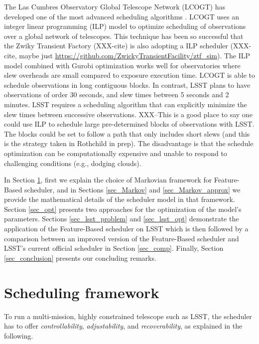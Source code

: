 \documentclass[12pt,aas_macros]{article}
\theoremstyle{definition}
\begin{document}
The Las Cumbres Observatory Global Telescope Network (LCOGT) has developed one of the most advanced scheduling algorithms \cite{Boroson14, Saunders14}. LCOGT uses an integer linear programming (ILP) model to optimize scheduling of observations over a global network of telescopes\cite{Lampoudi15}. This technique has been so successful that the Zwiky Transient Factory (XXX-cite) is also adopting a ILP scheduler (XXX-cite, maybe just \url{https://github.com/ZwickyTransientFacility/ztf_sim}). The ILP model combined with Gurobi optimization works well for observatories where slew overheads are small compared to exposure execution time. LCOGT is able to schedule observations in long contiguous blocks. In contrast, LSST plans to have observations of order 30 seconds, and slew times between 5 seconds and 2 minutes. LSST requires a scheduling algorithm that can explicitly minimize the slew times between successive observations. XXX--This is a good place to say one could use ILP to schedule large pre-determined blocks of observations with LSST. The blocks could be set to follow a path that only includes short slews (and this is the strategy taken in Rothchild in prep). The disadvantage is that the schedule optimization can be computationally expensive and unable to respond to challenging conditions (e.g., dodging clouds). 

In Section \ref{sec_SM}, first we explain the choice of Markovian framework for Feature-Based scheduler, and in Sections \ref{sec_Markov} and \ref{sec_Markov_approx} we provide the mathematical details of the scheduler model in that framework. Section \ref{sec_opt} presents two approaches for the optimization of the model's parameters. Sections \ref{sec_lsst_problem} and \ref{sec_lsst_opt} demonstrate the application of the Feature-Based scheduler on LSST which is then followed by a comparison between an improved version of the Feature-Based scheduler and LSST's current official scheduler in Section \ref{sec_comp}. Finally, Section \ref{sec_conclusion} presents our concluding remarks.



\section{Scheduling framework}\label{sec_SM}

To run a multi-mission, highly constrained telescope such as LSST, the scheduler has to offer \textit{controllability}, \textit{adjustability}, and \textit{recoverability}, as explained in the following.
\end{document}
